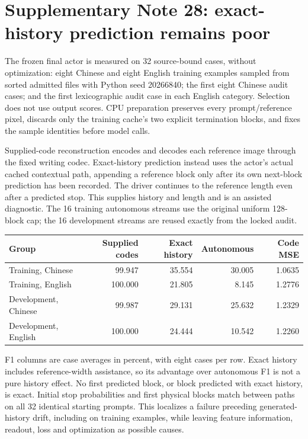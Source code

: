 \documentclass[10pt,a4paper]{article}
\begin{document}
\section*{Supplementary Note 28: exact-history prediction remains poor}
The frozen final actor is measured on 32 source-bound cases, without
optimization: eight Chinese and eight English training examples sampled from
sorted admitted files with Python seed 20266840; the first eight Chinese
audit cases; and the first lexicographic audit case in each English category.
Selection does not use output scores. CPU preparation preserves every
prompt/reference pixel, discards only the training cache's two explicit
termination blocks, and fixes the sample identities before model calls.

Supplied-code reconstruction encodes and decodes each reference image through
the fixed writing codec. Exact-history prediction instead uses the actor's
actual cached contextual path, appending a reference block only after its
own next-block prediction has been recorded. The driver continues to the
reference length even after a predicted stop. This supplies history and
length and is an assisted diagnostic. The 16 training autonomous streams use
the original uniform 128-block cap; the 16 development streams are reused
exactly from the locked audit.

\begin{center}\small
\begin{tabular}{lrrrr}
\toprule
Group & Supplied codes & Exact history & Autonomous & Code MSE \\
\midrule
Training, Chinese & 99.947 & 35.554 & 30.005 & 1.0635 \\
Training, English & 100.000 & 21.805 & 8.145 & 1.2776 \\
Development, Chinese & 99.987 & 29.131 & 25.632 & 1.2329 \\
Development, English & 100.000 & 24.444 & 10.542 & 1.2260 \\
\bottomrule
\end{tabular}

\end{center}

F1 columns are case averages in percent, with eight cases per row. Exact
history includes reference-width assistance, so its advantage over autonomous
F1 is not a pure history effect. No first predicted block, or block predicted
with exact history, is exact. Initial stop probabilities and first physical
blocks match between paths on all 32 identical starting prompts. This
localizes a failure preceding generated-history drift, including on training
examples, while leaving feature information, readout, loss and optimization
as possible causes.
\end{document}
